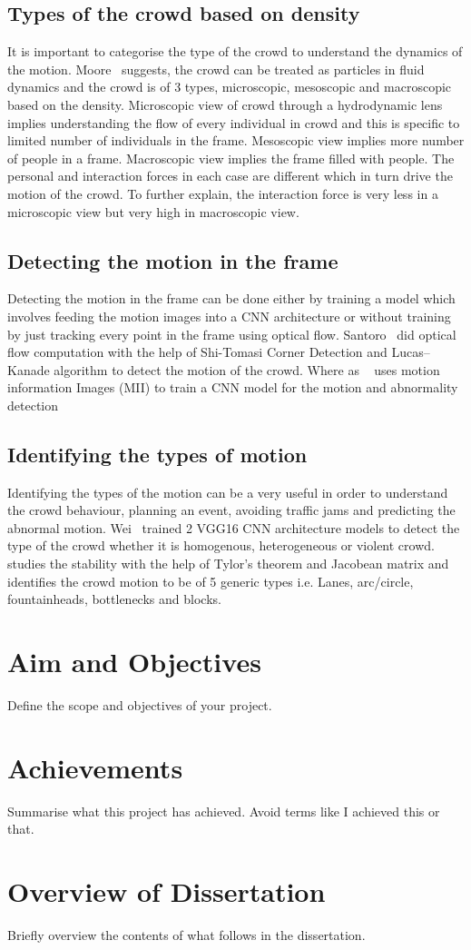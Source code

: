 \subsection{Types of the crowd based on density}
It is important to categorise the type of the crowd to understand the dynamics of the motion. 
Moore~\cite{moore2011visual} suggests, the crowd can be treated as particles in fluid dynamics and the 
crowd is of 3 types, microscopic, mesoscopic and macroscopic based on the density. Microscopic view 
of crowd through a hydrodynamic lens implies understanding the flow of every individual in crowd and 
this is specific to limited number of individuals in the frame. Mesoscopic view implies more number of 
people in a frame. Macroscopic view implies the frame filled with people. The personal and interaction 
forces in each case are different which in turn drive the motion of the crowd. To further explain, the 
interaction force is very less in a microscopic view but very high in macroscopic view.
\subsection{Detecting the motion in the frame}
Detecting the motion in the frame can be done either by training a model which involves feeding the 
motion images into a CNN architecture or without training by just tracking every point in the frame using 
optical flow. Santoro~\cite{santoro2010crowd} did optical flow computation with the help of Shi-Tomasi 
Corner Detection and Lucas–Kanade algorithm to detect the motion of the crowd. Where as 
~\cite{9078065} uses motion information Images (MII) to train a CNN model for the motion and abnormality detection
\subsection{Identifying the types of motion}
Identifying the types of the motion can be a very useful in order to understand the crowd behaviour, 
planning an event, avoiding traffic jams and predicting the abnormal motion. Wei~\cite{wei2020very} trained 2 VGG16 CNN architecture models to detect the type of the crowd whether it is homogenous, heterogeneous or violent crowd. ~\cite{solmaz2012identifying} studies the stability with the help of Tylor's theorem and Jacobean matrix and identifies the crowd motion to be of 5 generic types i.e. Lanes, arc/circle, fountainheads, bottlenecks and blocks.

\section{Aim and Objectives} \label{sec:objectives}
Define the scope and objectives of your project.

\section{Achievements}
Summarise what this project has achieved. Avoid terms like I achieved this or 
that. 

\section{Overview of Dissertation}
Briefly overview the contents of what follows in the dissertation.